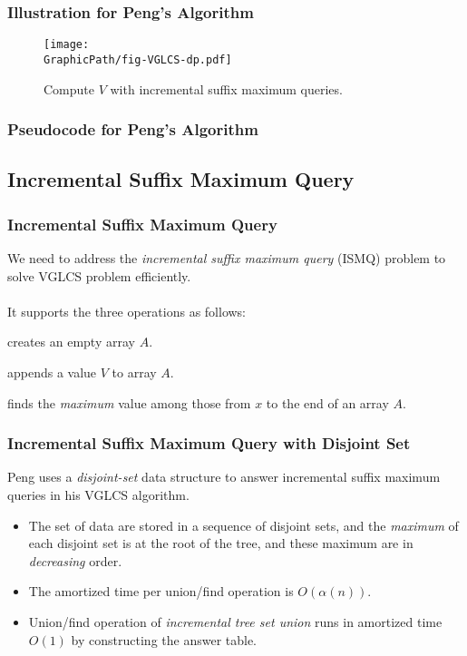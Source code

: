 \begin{frame}
    \frametitle{Illustration for Peng's Algorithm}
    \begin{figure}[!thb]
		\texttt{[image: \\GraphicPath/fig-VGLCS-dp.pdf]}
		\caption{Compute $V$ with incremental suffix maximum queries.}
	\end{figure}
\end{frame}

\begin{withoutheadline}
\begin{frame}
	\frametitle{Pseudocode for Peng's Algorithm}
	\begin{center}
		\scalebox{.7} { \begin{minipage}{1.2\textwidth}
			
			\end{minipage}
		}
	\end{center}
\end{frame}
\end{withoutheadline}

\subsection{Incremental Suffix Maximum Query}
\begin{frame}
    \frametitle{Incremental Suffix Maximum Query}

    We need to address the {\em incremental suffix maximum query} (ISMQ)
    problem to solve VGLCS problem efficiently.
    \\~\\
    It supports the three operations as follows:
    \begin{description}[align=right]
    	\setlength\itemsep{1em}
    	\item[{\sc Make}]
			creates an empty array $A$.
		\item[{\sc Append(V)}]
			appends a value $V$ to array $A$. 
		\item[{\sc Query(x)}]
			finds the {\em maximum} value among those from $x$ to the
			end of an array $A$.
    \end{description}
\end{frame}

\begin{frame}
    \frametitle{Incremental Suffix Maximum Query with Disjoint Set}

    Peng uses a {\em disjoint-set} data structure to answer incremental
	suffix maximum queries in his VGLCS algorithm.

	\begin{itemize}
		\setlength\itemsep{1em}
		\item 
			The set of data are stored in a sequence of disjoint sets,
			and the {\em maximum} of each disjoint set is at the root of
			the tree, and these maximum are in {\em decreasing} order.
		\item
			The amortized time per union/find operation is
			$O(\alpha(n))$.
		\item
			Union/find operation of {\em incremental tree set union}
			runs in amortized time $O(1)$ by constructing the answer
			table.
	\end{itemize}
\end{frame}

